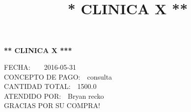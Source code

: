 \documentclass[10pt,a4paper]{letter}
\title{\bf ** CLINICA X **}
\begin{document}
\begin{center}
{\scshape\LARGE \bf *** CLINICA X ***\par}

\end{center}

FECHA:\ \ \ \ 2016-05-31 \\
CONCEPTO DE PAGO:\ \ consulta \\
CANTIDAD TOTAL:\ \ 1500.0 \\
ATENDIDO POR:\ \ Bryan recko \\
GRACIAS POR SU COMPRA! \\ \\

 
\end{document}
